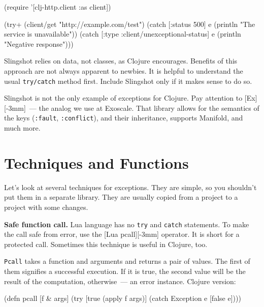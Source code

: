 \else

\begin{clojure}
(require '[clj-http.client :as client])

(try+
 (client/get "http://example.com/test")
 (catch [:status 500] e
   (println "The service is unavailable"))
 (catch [:type :client/unexceptional-status] e
   (println "Negative response")))
\end{clojure}

\fi

Slingshot relies on data, not classes, as Clojure encourages. Benefits of this approach are not always apparent to newbies. It is helpful to understand the usual \verb|try/catch| method first. Include Slingshot only if it makes sense to do so.


Slingshot is not the only example of exceptions for Clojure. Pay attention to [Ex][-3mm]~--- the analog we use at Exoscale.
That library allows for the semantics of the keys (\verb|:fault|, \verb|:conflict|), and their inheritance, supports Manifold, and much more.

\section{ Techniques and Functions }

Let's look at several techniques for exceptions. They are simple, so you shouldn't put them in a separate library. They are usually copied from a project to a project with some changes.


\label{pcall}

\textbf{Safe function call.} Lua language has no \verb|try| and \verb|catch| statements. To make the call safe from error, use the [Lua pcall][-3mm] operator. It is short for a protected call. Sometimes this technique is useful in Clojure, too.

\verb|Pcall| takes a function and arguments and returns a pair of values. The first of them signifies a successful execution. If it is true, the second value will be the result of the computation, otherwise~--- an error instance. Clojure version:


\begin{clojure}
(defn pcall [f & args]
  (try
    [true (apply f args)]
    (catch Exception e [false e])))
\end{clojure}

